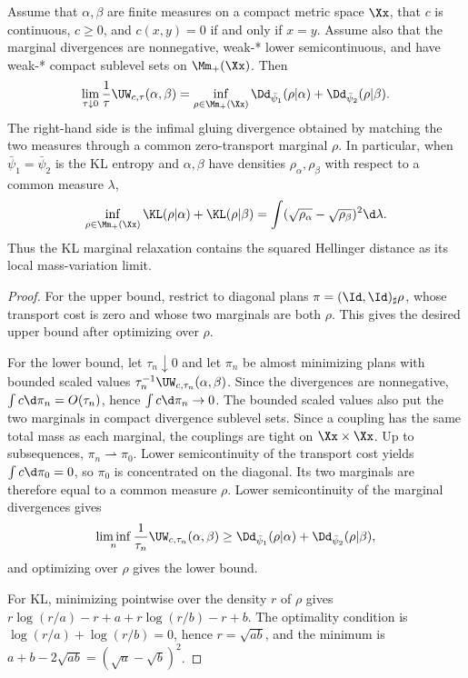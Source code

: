 \begin{prop}\label{prop-unbalanced-small-scale-limit}
	Assume that $\alpha,\beta$ are finite measures on a compact metric space $\Xx$, that $c$ is continuous, $c\geq0$, and $c(x,y)=0$ if and only if $x=y$. Assume also that the marginal divergences are nonnegative, weak-* lower semicontinuous, and have weak-* compact sublevel sets on $\Mm_+(\Xx)$. Then
	\[
		\lim_{\tau\downarrow0}\frac1\tau\UW_{c,\tau}(\alpha,\beta)
		=
		\inf_{\rho\in\Mm_+(\Xx)}
		\Dd_{\bar\psi_1}(\rho|\alpha)
		+
		\Dd_{\bar\psi_2}(\rho|\beta).
	\]
	The right-hand side is the infimal gluing divergence obtained by matching the two measures through a common zero-transport marginal $\rho$. In particular, when $\bar\psi_1=\bar\psi_2$ is the KL entropy and $\alpha,\beta$ have densities $\rho_\alpha,\rho_\beta$ with respect to a common measure $\lambda$,
	\[
		\inf_{\rho\in\Mm_+(\Xx)} \KL(\rho|\alpha)+\KL(\rho|\beta)
		=
		\int (\sqrt{\rho_\alpha}-\sqrt{\rho_\beta})^2\d\lambda .
	\]
	Thus the KL marginal relaxation contains the squared Hellinger distance as its local mass-variation limit.
\end{prop}

\begin{proof}
	For the upper bound, restrict to diagonal plans $\pi=(\Id,\Id)_\sharp\rho$, whose transport cost is zero and whose two marginals are both $\rho$. This gives the desired upper bound after optimizing over $\rho$.

	For the lower bound, let $\tau_n\downarrow0$ and let $\pi_n$ be almost minimizing plans with bounded scaled values $\tau_n^{-1}\UW_{c,\tau_n}(\alpha,\beta)$. Since the divergences are nonnegative, $\int c\d\pi_n=O(\tau_n)$, hence $\int c\d\pi_n\to0$. The bounded scaled values also put the two marginals in compact divergence sublevel sets. Since a coupling has the same total mass as each marginal, the couplings are tight on $\Xx\times\Xx$. Up to subsequences, $\pi_n\rightharpoonup\pi_0$. Lower semicontinuity of the transport cost yields $\int c\d\pi_0=0$, so $\pi_0$ is concentrated on the diagonal. Its two marginals are therefore equal to a common measure $\rho$. Lower semicontinuity of the marginal divergences gives
	\[
		\liminf_n\frac1{\tau_n}\UW_{c,\tau_n}(\alpha,\beta)
		\geq
		\Dd_{\bar\psi_1}(\rho|\alpha)+\Dd_{\bar\psi_2}(\rho|\beta),
	\]
	and optimizing over $\rho$ gives the lower bound.

	For KL, minimizing pointwise over the density $r$ of $\rho$ gives $r\log(r/a)-r+a+r\log(r/b)-r+b$. The optimality condition is $\log(r/a)+\log(r/b)=0$, hence $r=\sqrt{ab}$, and the minimum is $a+b-2\sqrt{ab}=(\sqrt a-\sqrt b)^2$.
\end{proof}

